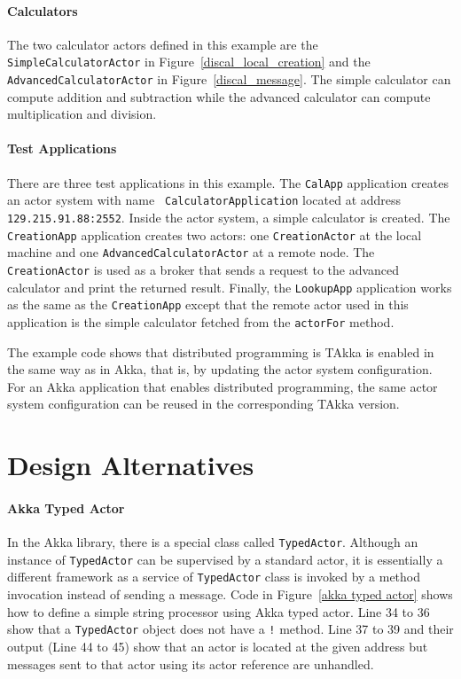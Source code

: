 \paragraph{Calculators} The two calculator actors defined in this example are 
the \\ {\tt SimpleCalculatorActor} in Figure~\ref{discal_local_creation} and 
the {\tt AdvancedCalculatorActor} in Figure~\ref{discal_message}.  The simple 
calculator can compute addition and subtraction while the advanced calculator 
can compute multiplication and division.


\paragraph{Test Applications} There are three test applications in this example.
The {\tt CalApp} application creates an actor system with name {\tt 
CalculatorApplication} located at address {\tt 129.215.91.88:2552}.  Inside the 
actor system, a simple calculator is created.  The {\tt CreationApp} 
application creates two actors: one {\tt CreationActor} at the local machine 
and one {\tt AdvancedCalculatorActor} at a remote node.  The {\tt 
CreationActor} is used as a broker that sends a request to the advanced 
calculator and print the returned result.  Finally, the {\tt LookupApp} 
application works as the same as the {\tt CreationApp} except that the remote 
actor used in this application is the simple calculator fetched from the 
{\tt actorFor} method.

\vspace{12 pt}

The example code shows that distributed programming is TAkka is enabled in the 
same way as in Akka, that is, by updating the actor system configuration.  For 
an Akka application that enables distributed programming, the same actor system 
configuration can be reused in the corresponding TAkka version.


\section{Design Alternatives}
\label{alternative_designs}

\paragraph{Akka Typed Actor}
In the Akka library, there is a special class called {\tt TypedActor}.
Although an instance of {\tt TypedActor} can be supervised by a
standard actor, it is essentially a different framework as a service
of {\tt TypedActor} class is invoked by a method 
invocation instead of sending a message.  Code in Figure~\ref{akka typed actor} shows 
how to define a simple string processor using Akka typed actor.  
Line 34 to 36 show that a {\tt TypedActor} object does not have a {\tt !} method.
Line 37 to 39 and their output (Line 44 to 45) show that an actor is located at 
the given address but messages sent to that actor using its actor reference are
unhandled.

